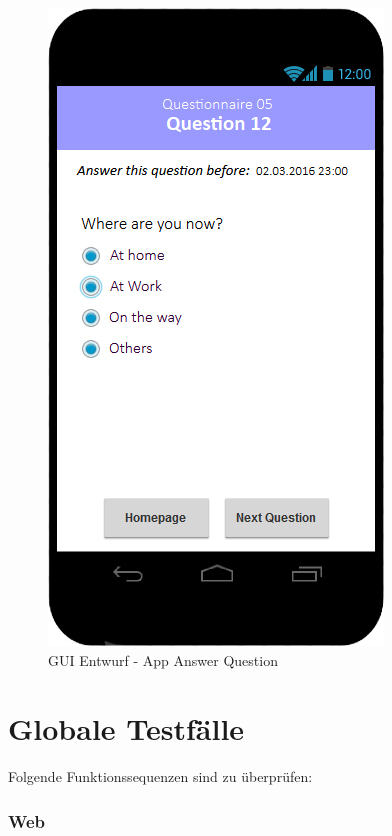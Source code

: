 \documentclass[a4paper]{scrreprt}
\begin{document}
            \vspace*{1cm}
	        \begin{figure}[ht]
                \centering
                \includegraphics[scale = 0.3]{android_answer.jpg}
                \caption{GUI Entwurf - App Answer Question}
            \end{figure}

    \chapter{Globale Testfälle}

        Folgende Funktionssequenzen sind zu \"uberpr\"ufen:

        \subsection{Web}
\end{document}
